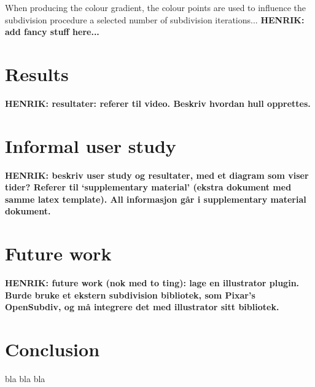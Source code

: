 \documentclass{egpubl}
\newcommand{\note}[3]{{\color{#2}\textbf{#1: #3}}}
\newcommand{\henrik}[1]{\note{HENRIK}{WildStrawberry}{#1}}
\begin{document}
When producing the colour gradient, the colour points are used to influence the subdivision procedure a selected number of subdivision iterations... \henrik{add fancy stuff here...}

\section{Results}
\label{sec:results}

\henrik{resultater: referer til video. Beskriv hvordan hull opprettes.}

\section{Informal user study}
\label{sec:evaluation}

\henrik{beskriv user study og resultater, med et diagram som viser tider? Referer til `supplementary material' (ekstra dokument med samme latex template). All informasjon går i supplementary material dokument.}

\section{Future work}
\label{sec:FW}

\henrik{future work (nok med to ting): lage en illustrator plugin. Burde bruke et ekstern subdivision bibliotek, som Pixar's OpenSubdiv, og må integrere det med illustrator sitt bibliotek.}

\section{Conclusion}

bla bla bla




\end{document}
